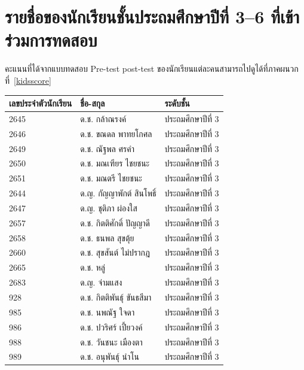 \section{รายชื่อของนักเรียนชั้นประถมศึกษาปีที่ 3--6 ที่เข้าร่วมการทดสอบ}
คะแนนที่ได้จากแบบทดสอบ Pre-test post-test ของนักเรียนแต่ละคนสามารถไปดูได้ที่ภาคผนวกที่~\ref{kidsscore}
\begin{table}[h]
    \begin{center}
        \begin{tabular}{ |p{3cm}|p{4cm}|p{3cm}| }
            \hline
            เลขประจำตัวนักเรียน & ชื่อ-สกุล & ระดับชั้น\\
            \hline
            2645 & ด.ช. กล้าณรงค์ & ประถมศึกษาปีที่ 3\\
            \hline
            2646 & ด.ช. ขณดล พาทยโกศล & ประถมศึกษาปีที่ 3\\
            \hline
            2649 & ด.ช. ณัฐพล ศรคำ & ประถมศึกษาปีที่ 3\\
            \hline
            2650 & ด.ช. มณเฑียร ไชยชนะ & ประถมศึกษาปีที่ 3\\
            \hline
            2651 & ด.ช. มณตรี ไชยชนะ & ประถมศึกษาปีที่ 3\\
            \hline
            2644 & ด.ญ. กัญญาพักต์ สินโพธิ์ & ประถมศึกษาปีที่ 3\\
            \hline
            2647 & ด.ญ. ชุติภา ผ่องใส & ประถมศึกษาปีที่ 3\\
            \hline
            2657 & ด.ช. กิตติศักดิ์ ปัญญาดี & ประถมศึกษาปีที่ 3\\
            \hline
            2658 & ด.ช. ธนพล สุขตุ้ย & ประถมศึกษาปีที่ 3\\
            \hline
            2660 & ด.ช. สุขสันต์ ไม่ปรากฎ & ประถมศึกษาปีที่ 3\\
            \hline
            2665 & ด.ช. หลู่ & ประถมศึกษาปีที่ 3\\
            \hline
            2683 & ด.ญ. จ่ามแสง & ประถมศึกษาปีที่ 3\\
            \hline
            928 & ด.ช. กิตติพันธุ์ ขันธสีมา & ประถมศึกษาปีที่ 3\\
            \hline
            985 & ด.ช. นพณัฐ ใจดา & ประถมศึกษาปีที่ 3\\
            \hline
            986 & ด.ช. ปวริศร์ เปี้ยวงค์ & ประถมศึกษาปีที่ 3\\
            \hline
            988 & ด.ช. วันชนะ เมืองตา & ประถมศึกษาปีที่ 3\\
            \hline
            989 & ด.ช. อนุพันธุ์ นำโน & ประถมศึกษาปีที่ 3\\

\end{tabular}
\end{center}
\end{table}
